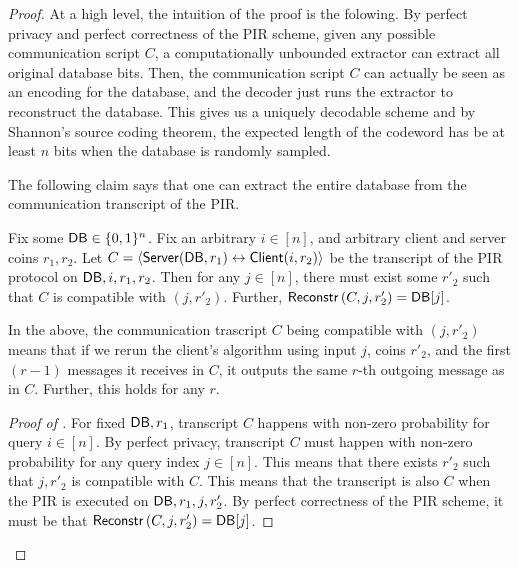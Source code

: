 \begin{proof}


At a high level, the intuition of the proof is the folowing. 
By perfect privacy and perfect correctness of the PIR scheme, given any possible communication script $C$, a computationally unbounded extractor can extract all original database bits. Then, the communication script $C$ can actually be seen as an encoding for the database, and the decoder just runs the extractor to reconstruct the database. This gives us a uniquely decodable scheme and by Shannon's source coding theorem, the expected length of the codeword has be at least $n$ bits when
the database is randomly sampled. 

The following claim says that one can extract the entire database from the 
communication transcript of the PIR.
\begin{claim}
Fix some ${\sf DB} \in \{0, 1\}^n$.  
Fix an arbitrary $i \in [n]$, and arbitrary client and server coins $r_1, r_2$.
Let $C = 
\langle {\sf Server}({\sf DB}, r_1) \leftrightarrow {\sf Client}(i, r_2) \rangle$
be the transcript of the PIR protocol on ${\sf DB}, i, r_1, r_2$.
Then for any $j \in [n]$, there must 
exist some $r'_2$ such that $C$ is compatible with $(j, r'_2)$.
Further, 
${\sf Reconstr}\left(C, j, r'_2\right) = {\sf DB}[j]$.
\label{clm:extract}
\end{claim}
In the above, the communication trascript $C$ being compatible with $(j, r'_2)$
means that if we rerun the client's algorithm using input $j$, coins  
$r'_2$, and the first $(r-1)$ messages it receives in $C$,
it outputs the same $r$-th outgoing message as in $C$. 
Further, this holds for any $r$.


\begin{proof}[Proof of ]
For fixed ${\sf DB}, r_1$, 
transcript $C$ happens with non-zero probability
for query $i \in [n]$. 
By perfect privacy, transcript $C$ must happen
with non-zero probability for any query index $j \in [n]$.
This means that there exists 
$r'_2$ such that $j, r'_2$ is compatible with $C$.
This means that the transcript is also $C$ when the PIR
is executed on ${\sf DB}, r_1, j, r'_2$.
By perfect correctness of the PIR scheme, it must be 
that ${\sf Reconstr}\left(C, j, r'_2\right) = {\sf DB}[j]$.
\end{proof}


\end{proof}
